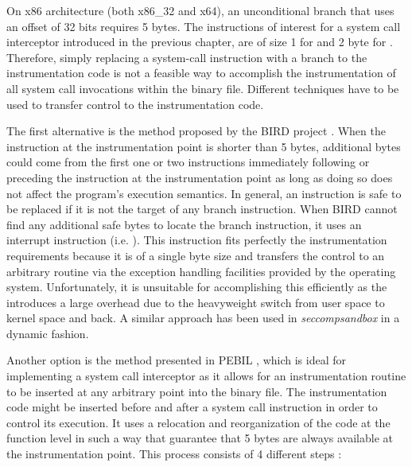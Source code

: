 On x86 architecture (both x86\_32 and x64), an unconditional branch that uses an offset of 32 bits requires 5 bytes. The instructions of interest for a system call interceptor introduced in the previous chapter, are of size 1 for  and 2 byte for . Therefore, simply replacing a system-call instruction with a branch to the instrumentation code is not a feasible way to accomplish the instrumentation of all system call invocations  within the binary file. Different techniques have to be used to transfer control to the instrumentation code. 

The first alternative is the method proposed by the BIRD project \cite{BIRD}. When the instruction at the instrumentation point is shorter than 5 bytes, additional bytes could come from the first one or two instructions immediately following or preceding the instruction at the instrumentation point as long as doing so does not affect the program’s execution semantics. In general, an instruction is safe to be replaced if it is not the target of any branch instruction. When BIRD cannot find any additional safe bytes to locate the branch instruction, it uses an interrupt instruction (i.e. ). This instruction fits perfectly the instrumentation requirements because it is of a single byte size and transfers the control to an arbitrary routine via the exception handling facilities provided by the operating system. Unfortunately, it is unsuitable for accomplishing this efficiently as the  introduces a large overhead due to the  heavyweight switch from user space  to kernel space  and back. A similar approach has been used in \emph{seccompsandbox} in a dynamic fashion.

Another option is the method presented in PEBIL \cite{PEBIL}, which is ideal for implementing a system call interceptor as it allows for an instrumentation routine to be inserted  at any arbitrary point into the binary file. The instrumentation code might be inserted before and after a system call instruction in order to control its execution. It uses a relocation and reorganization of the code at the function level in such a way that guarantee that 5 bytes are always available at the instrumentation point. This process consists of 4 different steps : 

